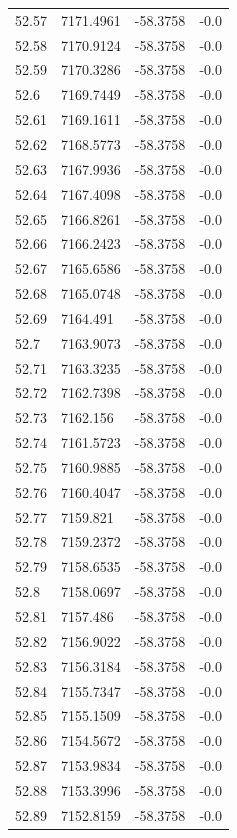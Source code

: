 \begin{table}[H]
\begin{tabular}{llll}
52.57 & 7171.4961 & -58.3758 & -0.0 \\
52.58 & 7170.9124 & -58.3758 & -0.0 \\
52.59 & 7170.3286 & -58.3758 & -0.0 \\
52.6 & 7169.7449 & -58.3758 & -0.0 \\
52.61 & 7169.1611 & -58.3758 & -0.0 \\
52.62 & 7168.5773 & -58.3758 & -0.0 \\
52.63 & 7167.9936 & -58.3758 & -0.0 \\
52.64 & 7167.4098 & -58.3758 & -0.0 \\
52.65 & 7166.8261 & -58.3758 & -0.0 \\
52.66 & 7166.2423 & -58.3758 & -0.0 \\
52.67 & 7165.6586 & -58.3758 & -0.0 \\
52.68 & 7165.0748 & -58.3758 & -0.0 \\
52.69 & 7164.491 & -58.3758 & -0.0 \\
52.7 & 7163.9073 & -58.3758 & -0.0 \\
52.71 & 7163.3235 & -58.3758 & -0.0 \\
52.72 & 7162.7398 & -58.3758 & -0.0 \\
52.73 & 7162.156 & -58.3758 & -0.0 \\
52.74 & 7161.5723 & -58.3758 & -0.0 \\
52.75 & 7160.9885 & -58.3758 & -0.0 \\
52.76 & 7160.4047 & -58.3758 & -0.0 \\
52.77 & 7159.821 & -58.3758 & -0.0 \\
52.78 & 7159.2372 & -58.3758 & -0.0 \\
52.79 & 7158.6535 & -58.3758 & -0.0 \\
52.8 & 7158.0697 & -58.3758 & -0.0 \\
52.81 & 7157.486 & -58.3758 & -0.0 \\
52.82 & 7156.9022 & -58.3758 & -0.0 \\
52.83 & 7156.3184 & -58.3758 & -0.0 \\
52.84 & 7155.7347 & -58.3758 & -0.0 \\
52.85 & 7155.1509 & -58.3758 & -0.0 \\
52.86 & 7154.5672 & -58.3758 & -0.0 \\
52.87 & 7153.9834 & -58.3758 & -0.0 \\
52.88 & 7153.3996 & -58.3758 & -0.0 \\
52.89 & 7152.8159 & -58.3758 & -0.0 \\

\end{tabular}
\end{table}
